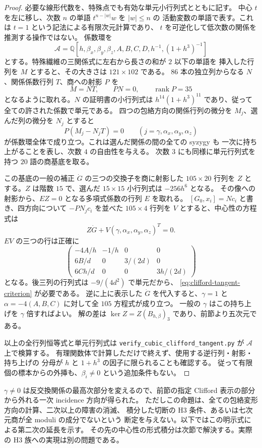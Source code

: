 \begin{proof}
必要な線形代数を、特殊点でも有効な単元小行列式とともに記す。
中心 $t$ を左に移し、次数 $n$ の単語 $t^{n-|w|}w$ を $|w|\leq n$ の
活動変数の単語で表す。これは $t=1$ という記法による有限次元計算であり、
$t$ を可逆化して低次数の関係を推測する操作ではない。
係数環を
\[
 \mathcal A=\mathbb Q[h,\beta_x,\beta_y,\beta_z,A,B,C,D,
                       h^{-1},(1+h^3)^{-1}]
\]
とする。特殊繊維の三関係式に左右から長さの和が $2$ 以下の単語を
挿入した行列を $M$ とすると、その大きさは $121\times102$ である。
$86$ 本の独立列からなる $N$、関係係数行列 $T$、商への射影 $P$ を
\[
 M=NT,\qquad PN=0,\qquad \operatorname{rank}P=35
\]
となるように取れる。$N$ の証明書の小行列式は
$h^{14}(1+h^3)^{11}$ であり、従って全ての許された係数で単元である。
四つの包絡方向の関係行列の微分を $M_j$、選んだ列の微分を $N_j$ とすると
\[
 P(M_j-N_jT)=0\qquad (j=\gamma,\alpha_x,\alpha_y,\alpha_z)
\]
が係数環全体で成り立つ。これは選んだ関係の間の全ての syzygy も
一次に持ち上がることを表し、次数 $4$ の自由性を与える。
次数 $3$ にも同様に単元行列式を持つ $20$ 語の商基底を取る。

この基底の一般の補正 $\dot G$ の三つの交換子を商に射影した
$105\times20$ 行列を $Z$ とする。$Z$ は階数 $15$ で、選んだ
$15\times15$ 小行列式は $-256h^6$ となる。
その像への射影から、$EZ=0$ となる多項式係数の行列 $E$ を取れる。
$[G_0,x_i]=Nc_i$ と書き、四方向について $-PN_jc_i$ を並べた
$105\times4$ 行列を $V$ とすると、中心性の方程式は
\[
 Z\dot G+V(\gamma,\alpha_x,\alpha_y,\alpha_z)^T=0.
\]
$EV$ の三つの行は正確に
\[
 \begin{pmatrix}
 -4A/h&-1/h&0&0\\
 6B/d&0&3/(2d)&0\\
 6Ch/d&0&0&3h/(2d)
 \end{pmatrix}
\]
となる。後三列の行列式は $-9/(4d^2)$ で単元だから、
\eqref{eq:clifford-tangent-criterion} が必要である。
逆に上に表示した $\dot G$ を代入すると、$\gamma=1$ と
$\alpha=-4(A,B,C)$ に対して全 $105$ 方程式が成り立つ。
一般の $\gamma$ はこの持ち上げを $\gamma$ 倍すればよい。
解の差は $\ker Z=Z(B_{h,\beta})_3$ であり、前節より五次元である。

以上の全行列恒等式と単元行列式は
\texttt{verify\_cubic\_clifford\_tangent.py} が $\mathcal A$ 上で検算する。
有理関数体で計算しただけで終えず、使用する逆行列・射影・持ち上げの
分母が $h$ と $1+h^3$ の因子に限られることも確認する。
従って有限個の標本からの外挿も、$\beta_i\ne0$ という追加条件もない。
\end{proof}

$\gamma\ne0$ は反交換関係の最高次部分を変えるので、前節の指定
Clifford 表示の部分から外れる一次 incidence 方向が得られた。
ただしこの命題は、全ての包絡変形方向の計算、二次以上の障害の消滅、
積分した切断の H3 条件、あるいは七次元商が全 moduli の成分でないという
断定を与えない。以下ではこの明示式による第二次の延長を示す。
その先の中心性の形式積分は次節で解決する。実際の H3 族への実現は別の問題である。

